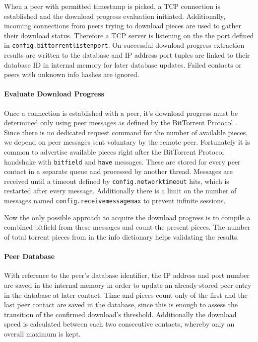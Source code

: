 \documentclass[10pt, a4paper]{scrartcl} %
\renewcommand{\_}{\origunderscore\allowbreak}
\newcommand{\config}[1]{\texttt{config.\allowbreak #1}}
\begin{document}
When a peer with permitted timestamp is picked, a TCP connection is established and the download progress evaluation initiated. Additionally, incoming connections from peers trying to download pieces are used to gather their download status. Therefore a TCP server is listening on the the port defined in \config{bittorrent\_listen\_port}. On successful download progress extraction results are written to the database and IP address port tuples are linked to their database ID in internal memory for later database updates. Failed contacts or peers with unknown info hashes are ignored.

\paragraph{Evaluate Download Progress}
Once a connection is established with a peer, it's download progress must be determined only using peer messages as defined by the BitTorrent Protocol \cite{bep3}. Since there is no dedicated request command for the number of available pieces, we depend on peer messages sent voluntary by the remote peer. Fortunately it is common to advertise available pieces right after the BitTorrent Protocol handshake with \texttt{bitfield} and \texttt{have} messages. These are stored for every peer contact in a separate queue and processed by another thread. Messages are received until a timeout defined by \config{network\_timeout} hits, which is restarted after every message. Additionally there is a limit on the number of messages named \config{receive\_message\_max} to prevent infinite sessions.

Now the only possible approach to acquire the download progress is to compile a combined bitfield from these messages and count the present pieces. The number of total torrent pieces from in the info dictionary helps validating the results.

\paragraph{Peer Database}
With reference to the peer's database identifier, the IP address and port number are saved in the internal memory in order to update an already stored peer entry in the database at later contact. Time and pieces count only of the first and the last peer contact are saved in the database, since this is enough to assess the transition of the confirmed download's threshold. Additionally the download speed is calculated between each two consecutive contacts, whereby only an overall maximum is kept.
\end{document}
